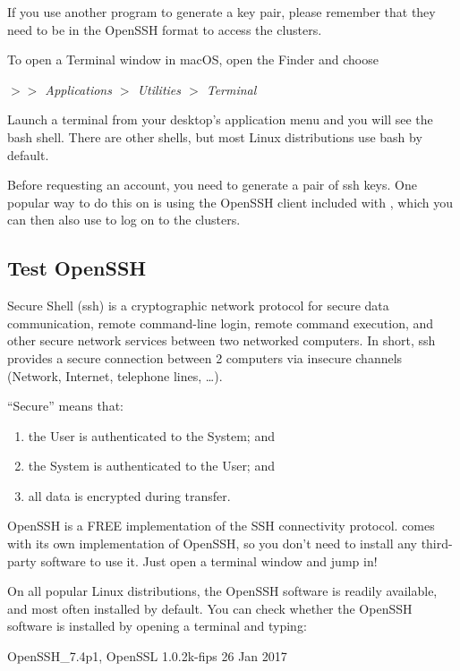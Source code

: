   If you use another program to generate a key pair, please remember that they
  need to be in the OpenSSH format to access the \hpc clusters.
\fi %

\ifmac
  To open a Terminal window in macOS, open the Finder and choose

  \emph{$>$$>$ Applications $>$ Utilities $>$ Terminal}
\fi

\iflinux
  Launch a terminal from your desktop's application menu and you will see the
  bash shell.
  There are other shells, but most Linux distributions use bash by default.
\fi

\ifmacORlinux
  Before requesting an account, you need to generate a pair of ssh keys. One
  popular way to do this on \OS is using the OpenSSH client included with \OS
  , which you can then also use to log on to the clusters.

  \subsection{Test OpenSSH}
  \label{sec:test-openssh}

  Secure Shell (ssh) is a cryptographic network protocol for secure data
  communication, remote command-line login, remote command execution, and other
  secure network services between two networked computers. In short, ssh
  provides a secure connection between 2 computers via insecure channels
  (Network, Internet, telephone lines, \ldots).

  ``Secure'' means that:
  \begin{enumerate}
    \item  the User is authenticated to the System; and
    \item  the System is authenticated to the User; and
    \item  all data is encrypted during transfer.
  \end{enumerate}

  OpenSSH is a FREE implementation of the SSH connectivity protocol. \OS comes
  with its own implementation of OpenSSH, so you don't need to install any
  third-party software to use it. Just open a terminal window and jump in!

  On all popular Linux distributions, the OpenSSH software is readily
  available, and most often installed by default. You can check whether the
  OpenSSH software is installed by opening a terminal and typing:

\begin{prompt}
OpenSSH_7.4p1, OpenSSL 1.0.2k-fips  26 Jan 2017
\end{prompt}

